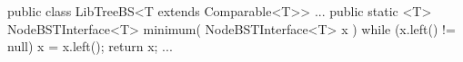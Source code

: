 public class LibTreeBS<T extends Comparable<T>> {
	...
	public static <T> NodeBSTInterface<T> minimum(
			NodeBSTInterface<T> x
		) {
		while (x.left() != null) {
			x = x.left();
		}
		return x;
	}
	...
}